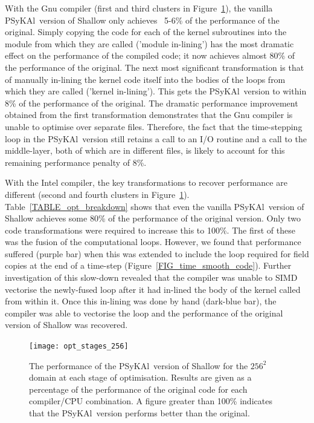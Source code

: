 \documentclass[journal]{IEEEtran}
\newcommand{\psykal}{{PS}y{KA}l\ }
\begin{document}
With the Gnu compiler (first and third clusters in
Figure~\ref{FIG_opt_stages_256}), the vanilla \psykal version of
Shallow only achieves ~5-6\% of the performance of the
original. Simply copying the code for each of the kernel subroutines
into the module from which they are called ('module in-lining') has
the most dramatic effect on the performance of the compiled code; it
now achieves almost 80\% of the performance of the original. The next
most significant transformation is that of manually in-lining the
kernel code itself into the bodies of the loops from which they are
called ('kernel in-lining'). This gets the \psykal version to within
8\% of the performance of the original.  The dramatic performance
improvement obtained from the first transformation demonstrates that
the Gnu compiler is unable to optimise over separate files. Therefore,
the fact that the time-stepping loop in the \psykal version still
retains a call to an I/O routine and a call to the middle-layer, both
of which are in different files, is likely to account for this
remaining performance penalty of 8\%.

With the Intel compiler, the key transformations to recover
performance are different (second and fourth clusters in
Figure~\ref{FIG_opt_stages_256}).  Table~\ref{TABLE_opt_breakdown}
shows that even the vanilla \psykal version of Shallow achieves some
80\% of the performance of the original version. Only two code
transformations were required to increase this to 100\%. The first of
these was the fusion of the computational loops. However, we found
that performance suffered (purple bar) when this was extended to
include the loop required for field copies at the end of a time-step
(Figure~\ref{FIG_time_smooth_code}). Further investigation of this
slow-down revealed that the compiler was unable to SIMD vectorise the
newly-fused loop after it had in-lined the body of the kernel called
from within it. Once this in-lining was done by hand (dark-blue bar),
the compiler was able to vectorise the loop and the performance of the
original version of Shallow was recovered.

\begin{figure}[!t]
\centering
\texttt{[image: opt\_stages\_256]}
\caption{The performance of the \psykal version of Shallow for the
  $256^{2}$ domain at each stage of optimisation. Results are given as
  a percentage of the performance of the original code for each
  compiler/CPU combination. A figure greater than 100\% indicates that
  the \psykal version performs better than the original.}
\label{FIG_opt_stages_256}
\end{figure}
\end{document}
